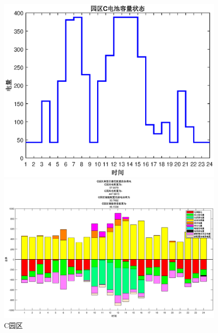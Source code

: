 \documentclass{cumcmthesis}
\begin{document}
 \begin{figure}[!h]  
\centering 
\begin{minipage}{.5\textwidth}  
  \centering  
  \includegraphics[width=.99\linewidth]{figures/31C电池.eps}  
\end{minipage}%
\begin{minipage}{.5\textwidth}  
  \centering  
  \includegraphics[width=.99\linewidth]{figures/Q31_Csort.eps}  
\end{minipage}  
\caption{C园区}  
\end{figure} 
\end{document}

